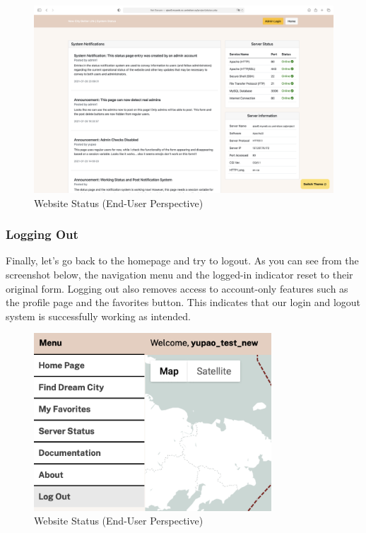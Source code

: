 \documentclass[12pt, letterpaper]{article}
\begin{document}
\begin{figure}[htbp]
	\centering
	\includegraphics[width=\textwidth]{images/30-journey-e09.png}
	\caption{Website Status (End-User Perspective)}
 \end{figure}

 \newpage
 \subsubsection*{Logging Out}
Finally, let's go back to the homepage and try to logout. As you can see from the screenshot below, the navigation menu and the logged-in indicator reset to their original form. Logging out also removes access to account-only features such as the profile page and the favorites button. This indicates that our login and logout system is successfully working as intended.

\begin{figure}[htbp]
	\centering
	\includegraphics[width=3.5in]{images/30-journey-e10a.png}
	\caption{Website Status (End-User Perspective)}
 \end{figure}
\end{document}
